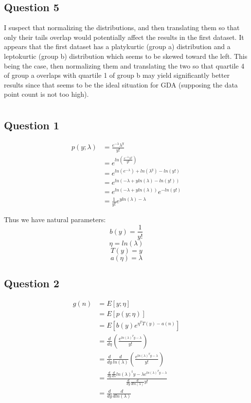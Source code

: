 \documentclass{article}
\begin{document}
\subsection{Question 5}

I suspect that normalizing the distributions, and then translating them so that 
only their tails overlap would potentially affect the results in the first 
dataset. 
It appears that the first dataset has a platykurtic (group a) distribution and
a leptokurtic (group b) distribution which seems to be skewed toward the left.
This being the case, then normalizing them and translating the two so that 
quartile 4 of group a overlaps with quartile 1 of group b may yield significantly
better results since that seems to be the ideal situation for GDA (supposing the
data point count is not too high).

\section{}
\subsection{Question 1}
\begin{center}
	\begin{align*}
		p(y; \lambda) &= \frac{e^{-\lambda}\lambda^y}{y!} \\
					  &= e^{
					  ln(
				  \frac{
			  e^{-\lambda}\lambda^y}{y!}
		  )} \\
		  &=  e ^{
			  ln(
			  e^{-\lambda}
			  )
			  + ln(\lambda^y)
			  - ln(y!)
		  } \\
			&= e^{ln(
				  -\lambda + yln(\lambda) - ln(y!))
			  }\\
			&= e^{
				ln(-\lambda + yln(\lambda))
			} e^{-ln(y!)}\\
			&= \frac{1}{y!}e^{yln(\lambda) - \lambda}
	\end{align*}
\end{center}
Thus we have natural parameters:
\[ b(y) = \frac{1}{y!} \]
\[ \eta = ln(\lambda) \]
\[ T(y) = y \]
\[ a(\eta) = \lambda \]

\subsection{Question 2}
\begin{center}
	\begin{align*}
		g(n) &= E\left[ y; \eta \right ]\\
			 &= E\left[ p(y; \eta) \right] \\
			 &= E\left[ b(y)e^{\eta^TT(y)-a(n)} \right]\\
			 &= \frac{d}{d \eta}\left( \frac{e^{ln(\lambda)^Ty - \lambda}}{y!}\right )\\
			 &= \frac{d}{dy}\frac{d}{ln(\lambda)}\left( \frac{e^{ln(\lambda)^Ty-\lambda}}{y!}\right )\\
			 &= \frac{\frac{d}{dy}\frac{d}{d \lambda}ln(\lambda)^ty -\lambda e^{ln(\lambda)^Ty-\lambda}}
			 {\frac{d}{dy} \frac{d}{d ln(\lambda)}y! }\\
			 &= \frac{d}{dy}\frac{d}{dln(\lambda)}
	 \end{align*}
\end{center}
\subsection{}
\end{document}
